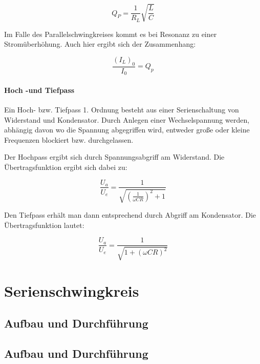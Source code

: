 \documentclass[12pt,a4paper]{article}
\begin{document}
\begin{equation}
Q_P = \frac{1}{R_L} \sqrt{\frac{L}{C}}
\label{equ:Güte_Bauteile}
\end{equation}

Im Falle des Parallelschwingkreises kommt es bei Resonanz zu einer Stromüberhöhung. Auch hier ergibt sich der Zusammenhang:

\begin{equation}
\frac{(I_L)_0}{I_0} = Q_p
\label{eq:Parallel_Strmhoch}
\end{equation}

\paragraph{Hoch -und Tiefpass}
Ein Hoch- bzw. Tiefpass 1. Ordnung besteht aus einer Serienschaltung von Widerstand und Kondensator. Durch Anlegen einer Wechselspannung werden, abhängig davon wo die Spannung abgegriffen wird, entweder große oder kleine Frequenzen blockiert bzw. durchgelassen.

Der Hochpass ergibt sich durch Spannungsabgriff am Widerstand. Die Übertragsfunktion ergibt sich dabei zu:

\begin{equation}
\frac{U_a}{U_e} = \frac{1}{\sqrt{(\frac{1}{\omega C R})^2+1}}
\end{equation}

Den Tiefpass erhält man dann entsprechend durch Abgriff am Kondensator. Die Übertragsfunktion lautet:

\begin{equation}
\frac{U_a}{U_e} = \frac{1}{\sqrt{1+(\omega C R)^2}}
\end{equation}

\section{Serienschwingkreis}

\subsection{Aufbau und Durchführung}


\subsection{Aufbau und Durchführung}
\end{document}

